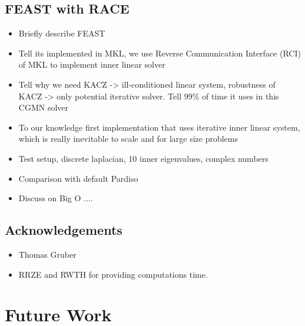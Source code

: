 \subsection{FEAST with RACE}
\begin{itemize}
	\item Briefly describe FEAST
	\item Tell its implemented in MKL, we use Reverse Communication Interface (RCI) of
		\acrshort{MKL} to implement inner linear solver
	\item Tell why we need KACZ -> ill-conditioned linear system, robustness of KACZ -> only potential iterative solver. Tell 99\% of time it uses in this CGMN solver
	\item To our knowledge first implementation that uses iterative inner linear system, which is really inevitable to scale and for large size problems
	\item  Test setup, discrete laplacian, 10 inner eigenvalues, complex numbers 
	\item Comparison with default Pardiso
	\item Discuss on Big O ....
\end{itemize}

\subsection{Acknowledgements}
\begin{itemize}
	\item Thomas Gruber
	\item RRZE and RWTH for providing computations time.
\end{itemize}

\section{Future Work}

